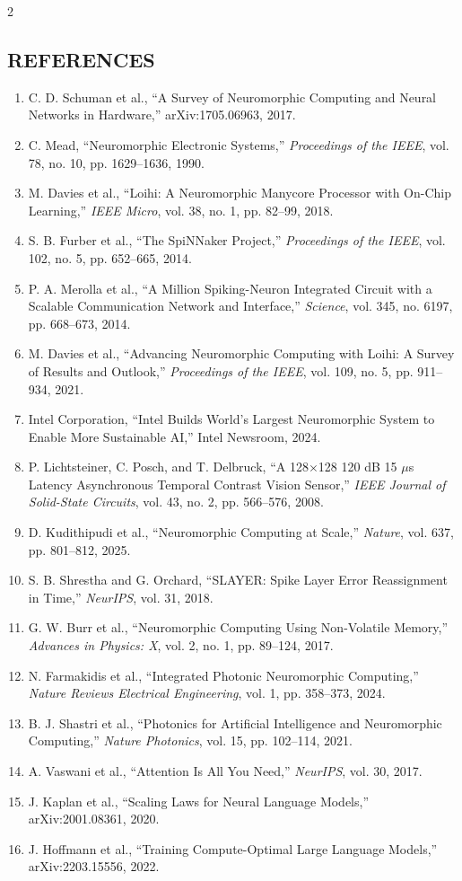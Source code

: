 \begin{multicols}{2}
  \subsection*{\centering\uppercase{References}}
  \footnotesize
  \begin{enumerate}
    \item C. D. Schuman et al., “A Survey of Neuromorphic Computing and Neural Networks in Hardware,” arXiv:1705.06963, 2017.
    \item C. Mead, “Neuromorphic Electronic Systems,” \textit{Proceedings of the IEEE}, vol. 78, no. 10, pp. 1629--1636, 1990.
    \item M. Davies et al., “Loihi: A Neuromorphic Manycore Processor with On-Chip Learning,” \textit{IEEE Micro}, vol. 38, no. 1, pp. 82--99, 2018.
    \item S. B. Furber et al., “The SpiNNaker Project,” \textit{Proceedings of the IEEE}, vol. 102, no. 5, pp. 652--665, 2014.
    \item P. A. Merolla et al., “A Million Spiking-Neuron Integrated Circuit with a Scalable Communication Network and Interface,” \textit{Science}, vol. 345, no. 6197, pp. 668--673, 2014.
    \item M. Davies et al., “Advancing Neuromorphic Computing with Loihi: A Survey of Results and Outlook,” \textit{Proceedings of the IEEE}, vol. 109, no. 5, pp. 911--934, 2021.
    \item Intel Corporation, “Intel Builds World's Largest Neuromorphic System to Enable More Sustainable AI,” Intel Newsroom, 2024.
    \item P. Lichtsteiner, C. Posch, and T. Delbruck, “A 128$\times$128 120 dB 15 $\mu$s Latency Asynchronous Temporal Contrast Vision Sensor,” \textit{IEEE Journal of Solid-State Circuits}, vol. 43, no. 2, pp. 566--576, 2008.
    \item D. Kudithipudi et al., “Neuromorphic Computing at Scale,” \textit{Nature}, vol. 637, pp. 801--812, 2025.
    \item S. B. Shrestha and G. Orchard, “SLAYER: Spike Layer Error Reassignment in Time,” \textit{NeurIPS}, vol. 31, 2018.
    \item G. W. Burr et al., “Neuromorphic Computing Using Non-Volatile Memory,” \textit{Advances in Physics: X}, vol. 2, no. 1, pp. 89--124, 2017.
    \item N. Farmakidis et al., “Integrated Photonic Neuromorphic Computing,” \textit{Nature Reviews Electrical Engineering}, vol. 1, pp. 358--373, 2024.
    \item B. J. Shastri et al., “Photonics for Artificial Intelligence and Neuromorphic Computing,” \textit{Nature Photonics}, vol. 15, pp. 102--114, 2021.
    \item A. Vaswani et al., “Attention Is All You Need,” \textit{NeurIPS}, vol. 30, 2017.
    \item J. Kaplan et al., “Scaling Laws for Neural Language Models,” arXiv:2001.08361, 2020.
    \item J. Hoffmann et al., “Training Compute-Optimal Large Language Models,” arXiv:2203.15556, 2022.
  \end{enumerate}
\end{multicols}
